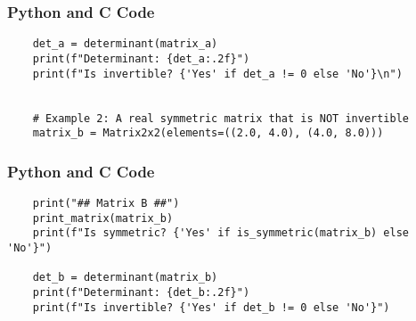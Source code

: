 \documentclass{beamer}
\begin{document}
\begin{frame}[fragile]
\frametitle{Python and C Code}
\begin{lstlisting}
    det_a = determinant(matrix_a)
    print(f"Determinant: {det_a:.2f}")
    print(f"Is invertible? {'Yes' if det_a != 0 else 'No'}\n")


    # Example 2: A real symmetric matrix that is NOT invertible
    matrix_b = Matrix2x2(elements=((2.0, 4.0), (4.0, 8.0)))
\end{lstlisting}
\end{frame}

\begin{frame}[fragile]
\frametitle{Python and C Code}
\begin{lstlisting}
    print("## Matrix B ##")
    print_matrix(matrix_b)
    print(f"Is symmetric? {'Yes' if is_symmetric(matrix_b) else 'No'}")

    det_b = determinant(matrix_b)
    print(f"Determinant: {det_b:.2f}")
    print(f"Is invertible? {'Yes' if det_b != 0 else 'No'}")
\end{lstlisting}
\end{frame}
\end{document}
